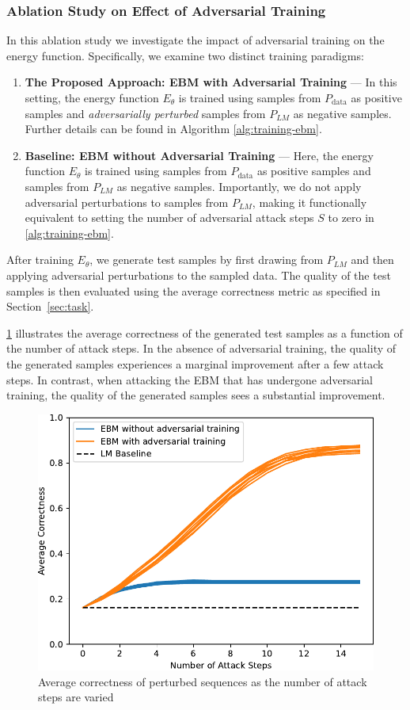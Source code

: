 \documentclass{article}
\begin{document}
\subsubsection{Ablation Study on Effect of Adversarial Training}
  In this ablation study we investigate the impact of adversarial training on the energy function. Specifically, we examine two distinct training paradigms:
  \begin{enumerate}
    \item \textbf{The Proposed Approach: EBM with Adversarial Training} ---
    In this setting, the energy function \(E_\theta\) is trained using samples from \(P_\text{data}\) as positive samples and \emph{adversarially perturbed} samples from \(P_{LM}\) as negative samples. Further details can be found in Algorithm \ref{alg:training-ebm}.
    \item \textbf{Baseline: EBM without Adversarial Training} --- 
    Here, the energy function \(E_\theta\) is trained using samples from \(P_\text{data}\) as positive samples and samples from \(P_{LM}\) as negative samples. Importantly, we do not apply adversarial perturbations to samples from \(P_{LM}\), making it functionally equivalent to setting the number of adversarial attack steps \(S\) to zero in \cref{alg:training-ebm}.
  \end{enumerate}
  After training \( E_\theta \), we generate test samples by first drawing from \( P_{LM} \) and then applying adversarial perturbations to the sampled data. The quality of the test samples is then evaluated using the average correctness metric as specified in Section~\ref{sec:task}.
  
  \cref{fig:correct_curve} illustrates the average correctness of the generated test samples as a function of the number of attack steps. In the absence of adversarial training, the quality of the generated samples experiences a marginal improvement after a few attack steps. In contrast, when attacking the EBM that has undergone adversarial training, the quality of the generated samples sees a substantial improvement.
  
  \begin{figure}[H]
      \centering
      \includegraphics[width=0.5\linewidth]{correct_curve}
      \caption{Average correctness of perturbed sequences as the number of  attack steps are varied}
      \label{fig:correct_curve}
  \end{figure}
\end{document}
